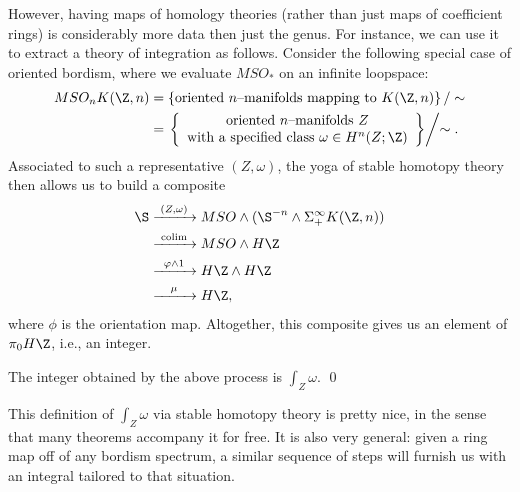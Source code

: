 However, having maps of homology theories (rather than just maps of coefficient rings) is considerably more data then just the genus.  For instance, we can use it to extract a theory of integration as follows.  Consider the following special case of oriented bordism, where we evaluate $MSO_*$ on an infinite loopspace:
\begin{align*}
MSO_n K(\Z, n) & = \left\{ \text{oriented $n$--manifolds mapping to $K(\Z, n)$} \right\} / \sim \\
& = \left. \left\{ \begin{array}{c}\text{oriented $n$--manifolds $Z$} \\ \text{with a specified class $\omega \in H^n(Z; \Z)$} \end{array}\right\} \middle/ \sim \right. .
\end{align*}
Associated to such a representative $(Z, \omega)$, the yoga of stable homotopy theory then allows us to build a composite
\begin{align*}
\S & \xrightarrow{\mathmakebox[2.5em]{(Z, \omega)}} MSO \sm (\S^{-n} \sm \Susp^\infty_+ K(\Z, n)) \\ 
& \xrightarrow{\mathmakebox[2.5em]{\colim}} MSO \sm H\Z \\
& \xrightarrow{\mathmakebox[2.5em]{\phi \sm 1}} H\Z \sm H\Z \\
& \xrightarrow{\mathmakebox[2.5em]{\mu}} H\Z,
\end{align*}
where $\phi$ is the orientation map.  Altogether, this composite gives us an element of $\pi_0 H\Z$, i.e., an integer.

\begin{lemma}
The integer obtained by the above process is $\int_Z \omega$. \qed
\end{lemma}

\noindent This definition of $\int_Z \omega$ via stable homotopy theory is pretty nice, in the sense that many theorems accompany it for free.  It is also very general: given a ring map off of any bordism spectrum, a similar sequence of steps will furnish us with an integral tailored to that situation.

